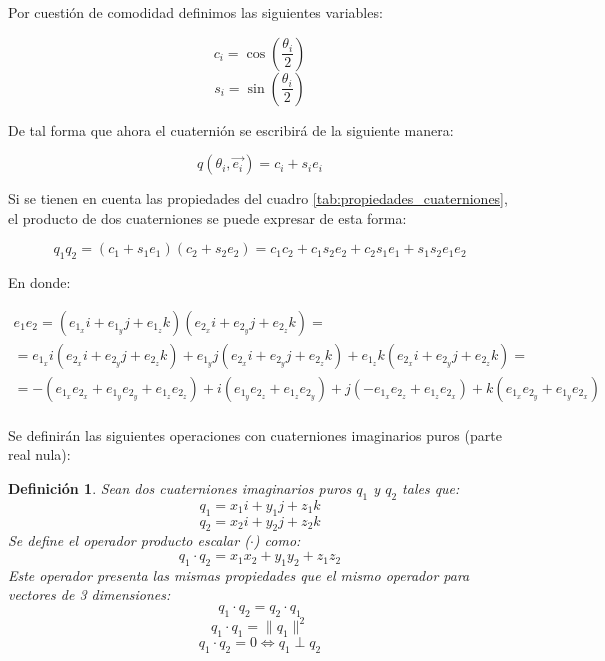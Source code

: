 \documentclass[12pt, a4paper]{report}
\newtheorem{defn}{Definición}[section]
\begin{document}
Por cuestión de comodidad definimos las siguientes variables:

\begin{equation}
c_i = \cos \left( \frac{\theta_i}{2} \right)
\end{equation}
\begin{equation}
s_i = \sin \left( \frac{\theta_i}{2} \right)
\end{equation}

De tal forma que ahora el cuaternión se escribirá de la siguiente manera:

\begin{equation} \label{eq: q_theta_e}
q(\theta_i, \vec{e_i}) = c_i + s_i e_i
\end{equation}

Si se tienen en cuenta las propiedades del cuadro \ref{tab:propiedades_cuaterniones}, el producto de dos cuaterniones se puede expresar de esta forma:

\begin{equation} \label{eq: E11}
q_1 q_2 = \left( c_1 + s_1 e_1 \right) \left( c_2 + s_2 e_2 \right) = c_1 c_2 + c_1 s_2 e_2 + c_2 s_1 e_1 + s_1 s_2 e_1 e_2
\end{equation}

En donde:

\begin{multline} \label{eq: E10}
e_1 e_2 = (e_{1_x} i + e_{1_y} j + e_{1_z} k)(e_{2_x} i + e_{2_y} j + e_{2_z} k) = \\
= e_{1_x} i (e_{2_x} i + e_{2_y} j + e_{2_z} k) + e_{1_y} j (e_{2_x} i + e_{2_y} j + e_{2_z} k) + e_{1_z} k (e_{2_x} i + e_{2_y} j + e_{2_z} k) = \\
= -(e_{1_x} e_{2_x} + e_{1_y} e_{2_y} + e_{1_z} e_{2_z}) + i (e_{1_y} e_{2_z} + e_{1_z} e_{2_y}) + j (-e_{1_x} e_{2_z} + e_{1_z} e_{2_x}) + k (e_{1_x} e_{2_y} + e_{1_y} e_{2_x}) \\
\end{multline}

Se definirán las siguientes operaciones con cuaterniones imaginarios puros (parte real nula):

\begin{defn}
Sean dos cuaterniones imaginarios puros $q_1$ y $q_2$ tales que:
$$ q_1 = x_1i + y_1j + z_1k $$
$$ q_2 = x_2i + y_2j + z_2k $$
Se define el operador producto escalar ($\cdot$) como:
$$ q_1 \cdot q_2 = x_1x_2 + y_1y_2 + z_1z_2 $$
Este operador presenta las mismas propiedades que el mismo operador para vectores de 3 dimensiones:
$$ q_1 \cdot q_2 = q_2 \cdot q_1 $$
$$ q_1 \cdot q_1 = \|q_1\|^2 $$
$$ q_1 \cdot q_2 = 0 \iff q_1 \perp q_2 $$
\end{defn}
\end{document}
